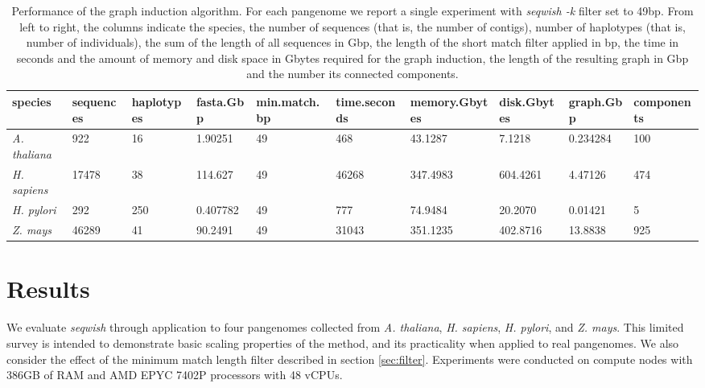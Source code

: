 \documentclass{bioinfo}
\theoremstyle{definition}
\begin{document}
\begin{table*}[!ht]
    \centering
    \caption{Performance of the graph induction algorithm.
        For each pangenome we report a single experiment with \textit{seqwish -k} filter set to 49bp.
        From left to right, the columns indicate the species, the number of sequences (that is, the number of contigs), number of haplotypes (that is, number of individuals), the sum of the length of all sequences in Gbp, the length of the short match filter applied in bp, the time in seconds and the amount of memory and disk space in Gbytes required for the graph induction, the length of the resulting graph in Gbp and the number its connected components.
        }
    \label{tab:experiments}
    \begin{tabular}{|l|l|l|l|l|l|l|l|l|l|}
        \hline
        species & sequences & haplotypes & fasta.Gbp & min.match.bp & time.seconds & memory.Gbytes & disk.Gbytes & graph.Gbp & components \\ \hline
        \textit{A. thaliana} & 922 & 16 & 1.90251 & 49 & 468 & 43.1287 & 7.1218 & 0.234284 & 100 \\ \hline
        \textit{H. sapiens} & 17478 & 38 & 114.627 & 49 & 46268 & 347.4983 & 604.4261 & 4.47126 & 474 \\ \hline
        \textit{H. pylori} & 292 & 250 & 0.407782 & 49 & 777 & 74.9484 & 20.2070 & 0.01421 & 5 \\ \hline
        \textit{Z. mays} & 46289 & 41 & 90.2491 & 49 & 31043 & 351.1235 & 402.8716 & 13.8838 & 925 \\ \hline
    \end{tabular}
\end{table*}

\section{Results}
\label{sec:results}

We evaluate \textit{seqwish} through application to four pangenomes collected from \textit{A. thaliana}, \textit{H. sapiens}, \textit{H. pylori}, and \textit{Z. mays}.
This limited survey is intended to demonstrate basic scaling properties of the method, and its practicality when applied to real pangenomes.
We also consider the effect of the minimum match length filter described in section \ref{sec:filter}.
Experiments were conducted on compute nodes with 386GB of RAM and AMD EPYC 7402P processors with 48 vCPUs.

\end{document}
